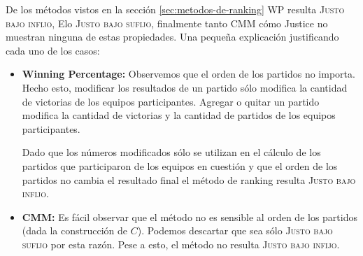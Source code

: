 \documentclass[a4paper]{article}
\begin{document}
De los métodos vistos en la sección \ref{sec:metodos-de-ranking} WP resulta \textsc{Justo bajo infijo}, Elo \textsc{Justo bajo sufijo}, finalmente tanto CMM cómo Justice no muestran ninguna de estas propiedades. Una pequeña explicación justificando cada uno de los casos:
\begin{itemize}
    \item \textbf{Winning Percentage:} Observemos que el orden de los partidos no importa. Hecho esto, modificar los resultados de un partido sólo modifica la cantidad de victorias de los equipos participantes. Agregar o quitar un partido modifica la cantidad de victorias y la cantidad de partidos de los equipos participantes.

    Dado que los números modificados sólo se utilizan en el cálculo de los partidos que participaron de los equipos en cuestión y que el orden de los partidos no cambia el resultado final el método de ranking resulta \textsc{Justo bajo infijo}.

    \item \textbf{CMM:} Es fácil observar que el método no es sensible al orden de los partidos (dada la construcción de $C$). Podemos descartar que sea sólo \textsc{Justo bajo sufijo} por esta razón. Pese a esto, el método no resulta \textsc{Justo bajo infijo}.


\end{itemize}
\end{document}
